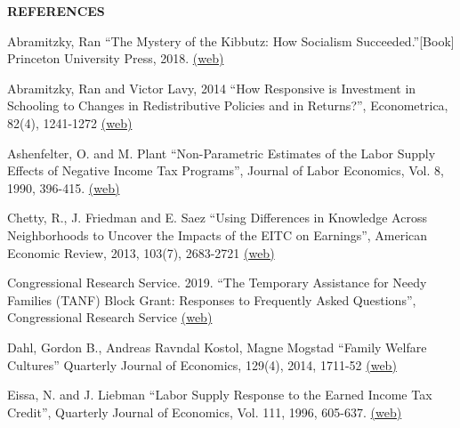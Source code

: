 \documentclass[landscape]{slides}
\begin{document}
\begin{slide}
\begin{center}
{\bf REFERENCES}
\end{center}
{\small

Abramitzky, Ran ``The Mystery of the Kibbutz: How Socialism Succeeded.''[Book] Princeton University Press,
2018. \href{http://elsa.berkeley.edu/~saez/course/Abramitzky_book_presentation.pdf} {(web)}

Abramitzky, Ran and Victor Lavy, 2014 ``How Responsive is Investment in Schooling to Changes in Redistributive Policies and in Returns?'', Econometrica, 82(4), 1241-1272 \href{http://elsa.berkeley.edu/~saez/course/Abramitzky-Lavy14.pdf} {(web)}

Ashenfelter, O. and M. Plant ``Non-Parametric Estimates of the Labor Supply Effects of Negative Income Tax Programs'', Journal of Labor Economics, Vol. 8, 1990, 396-415. \href{http://links.jstor.org/stable/pdfplus/2535218.pdf} {(web)}


Chetty, R., J. Friedman and E. Saez ``Using Differences in Knowledge Across Neighborhoods
to Uncover the Impacts of the EITC on Earnings'', 
American Economic Review, 2013, 103(7), 2683-2721 \href{http://eml.berkeley.edu/~saez/chetty-friedman-saezAER13EITC.pdf} {(web)}

Congressional Research Service. 2019.  ``The Temporary Assistance for Needy Families (TANF) Block Grant: Responses to Frequently Asked Questions'', Congressional Research Service
\href{https://fas.org/sgp/crs/misc/RL32760.pdf} {(web)}

Dahl, Gordon B., Andreas Ravndal Kostol, Magne Mogstad ``Family Welfare Cultures''
Quarterly Journal of Economics, 129(4), 2014, 1711-52 \href{http://elsa.berkeley.edu/~saez/course/dahl-kostol-mogstadQJE14.pdf} {(web)} 


Eissa, N. and J. Liebman ``Labor Supply Response to the Earned Income Tax Credit'', Quarterly Journal of Economics, Vol. 111, 1996, 605-637. \href{http://links.jstor.org/stable/pdfplus/2946689.pdf} {(web)}

}
\end{slide}
\end{document}
